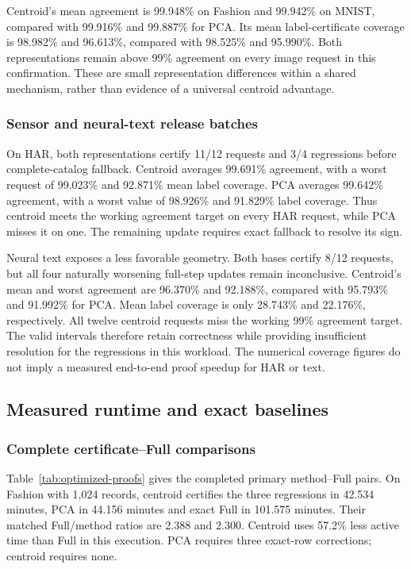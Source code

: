 Centroid's mean agreement is 99.948\% on Fashion and 99.942\% on MNIST,
compared with 99.916\% and 99.887\% for PCA. Its mean label-certificate
coverage is 98.982\% and 96.613\%, compared with 98.525\% and 95.990\%.
Both representations remain above 99\% agreement on every image request
in this confirmation. These are small representation differences within
a shared mechanism, rather than evidence of a universal centroid advantage.


\subsubsection{Sensor and neural-text release batches}
On HAR, both representations certify 11/12 requests and 3/4 regressions
before complete-catalog fallback. Centroid averages 99.691\% agreement,
with a worst request of 99.023\% and 92.871\% mean label coverage. PCA
averages 99.642\% agreement, with a worst value of 98.926\% and 91.829\%
label coverage. Thus centroid meets the working agreement target on every
HAR request, while PCA misses it on one. The remaining update requires
exact fallback to resolve its sign.

Neural text exposes a less favorable geometry. Both bases certify 8/12
requests, but all four naturally worsening full-step updates remain
inconclusive. Centroid's mean and worst agreement are 96.370\% and
92.188\%, compared with 95.793\% and 91.992\% for PCA. Mean label coverage
is only 28.743\% and 22.176\%, respectively. All twelve centroid requests
miss the working 99\% agreement target. The valid intervals therefore
retain correctness while providing insufficient resolution for the
regressions in this workload. The numerical coverage figures do not imply
a measured end-to-end proof speedup for HAR or text.


\subsection{Measured runtime and exact baselines}
\subsubsection{Complete certificate--Full comparisons}
Table~\ref{tab:optimized-proofs} gives the completed primary method--Full
pairs. On Fashion with 1,024 records, centroid certifies the three
regressions in 42.534 minutes, PCA in 44.156 minutes and exact Full in
101.575 minutes. Their matched Full/method ratios are 2.388 and 2.300.
Centroid uses 57.2\% less active time than Full in this execution. PCA
requires three exact-row corrections; centroid requires none.

